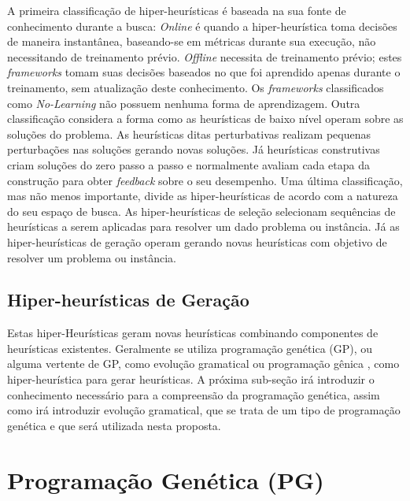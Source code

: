A primeira classificação de hiper-heurísticas é baseada na sua fonte de conhecimento durante a busca: \textit{Online} é quando a hiper-heurística toma decisões de maneira instantânea, baseando-se em métricas durante sua execução, não necessitando de treinamento prévio. \textit{Offline} necessita de treinamento prévio; estes \textit{frameworks}  tomam suas decisões baseados no que foi aprendido apenas durante o treinamento, sem atualização deste conhecimento. Os \textit{frameworks} classificados como \textit{No-Learning} não possuem nenhuma forma de aprendizagem. Outra classificação considera a forma como as heurísticas de baixo nível operam sobre as soluções do problema. As heurísticas ditas perturbativas realizam pequenas perturbações nas soluções gerando novas soluções. Já heurísticas construtivas criam soluções do zero passo a passo e normalmente avaliam cada etapa da construção para obter \textit{feedback} sobre o seu desempenho. Uma última  classificação, mas não menos importante, divide as hiper-heurísticas de acordo com a  natureza do seu espaço de busca. As hiper-heurísticas de seleção selecionam sequências de heurísticas a serem aplicadas para resolver um dado problema ou instância. Já as hiper-heurísticas de geração operam gerando novas heurísticas com objetivo de resolver um problema ou instância.


\subsection{Hiper-heurísticas de Geração}
\label{Hiper-Heuristicas-Geraçao}

Estas hiper-Heurísticas geram novas heurísticas combinando componentes de heurísticas existentes. Geralmente se utiliza programação genética (GP), ou alguma vertente de GP, como evolução gramatical \cite{ryan1998grammatical} ou programação gênica \cite{ferreira2006gene}, como hiper-heurística para gerar heurísticas. A próxima sub-seção irá introduzir o conhecimento necessário para a compreensão da programação genética, assim como irá introduzir evolução gramatical, que se trata de um tipo de programação genética e que será utilizada nesta proposta.

\section{Programação Genética (PG)}
\label{subsection:PG}

